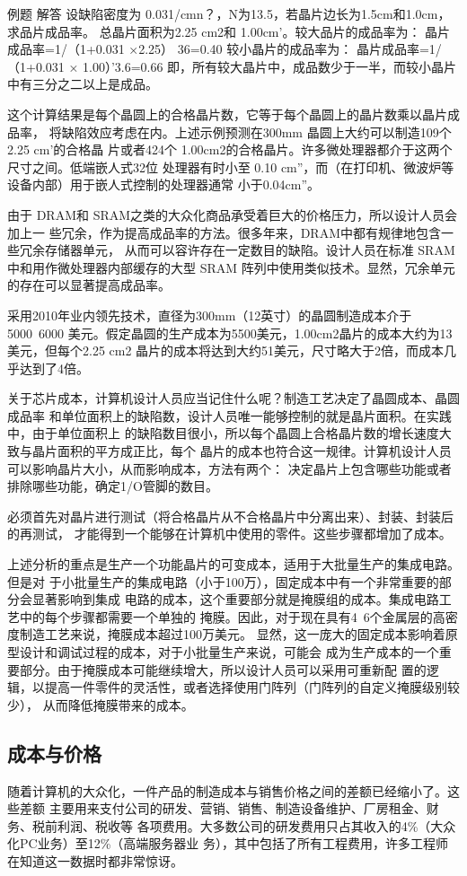 例题
解答
设缺陷密度为 0.031/cmn？，N为13.5，若晶片边长为1.5cm和1.0cm，求品片成品率。
总晶片面积为2.25 cm2和 1.00cm’。较大品片的成品率为：
晶片成品率=1/（1+0.031 ×2.25） 36=0.40
较小晶片的成品率为：
晶片成品率=1/（1+0.031 × 1.00）'3.6=0.66
即，所有较大晶片中，成品数少于一半，而较小晶片中有三分之二以上是成品。

这个计算结果是每个晶圆上的合格晶片数，它等于每个晶圆上的晶片数乘以晶片成品率，
将缺陷效应考虑在内。上述示例预测在300mm 晶圆上大约可以制造109个 2.25 cm’的合格晶
片或者424个 1.00cm2的合格晶片。许多微处理器都介于这两个尺寸之间。低端嵌人式32位
处理器有时小至 0.10 cm”，而（在打印机、微波炉等设备内部）用于嵌人式控制的处理器通常
小于0.04cm”。

由于 DRAM和 SRAM之类的大众化商品承受着巨大的价格压力，所以设计人员会加上一
些冗余，作为提高成品率的方法。很多年来，DRAM中都有规律地包含一些冗余存储器单元，
从而可以容许存在一定数目的缺陷。设计人员在标准 SRAM 中和用作微处理器内部缓存的大型
SRAM 阵列中使用类似技术。显然，冗余单元的存在可以显著提高成品率。

采用2010年业内领先技术，直径为300mm（12英寸）的晶圆制造成本介于 5000~6000
美元。假定晶圆的生产成本为5500美元，1.00cm2晶片的成本大约为13美元，但每个2.25 cm2
晶片的成本将达到大约51美元，尺寸略大于2倍，而成本几乎达到了4倍。

关于芯片成本，计算机设计人员应当记住什么呢？制造工艺决定了晶圆成本、晶圆成品率
和单位面积上的缺陷数，设计人员唯一能够控制的就是晶片面积。在实践中，由于单位面积上
的缺陷数目很小，所以每个晶圆上合格晶片数的增长速度大致与晶片面积的平方成正比，每个
晶片的成本也符合这一规律。计算机设计人员可以影响晶片大小，从而影响成本，方法有两个：
决定晶片上包含哪些功能或者排除哪些功能，确定1/O管脚的数目。

必须首先对晶片进行测试（将合格晶片从不合格晶片中分离出来）、封装、封装后的再测试，
才能得到一个能够在计算机中使用的零件。这些步骤都增加了成本。

上述分析的重点是生产一个功能晶片的可变成本，适用于大批量生产的集成电路。但是对
于小批量生产的集成电路（小于100万），固定成本中有一个非常重要的部分会显著影响到集成
电路的成本，这个重要部分就是掩膜组的成本。集成电路工艺中的每个步骤都需要一个单独的
掩膜。因此，对于现在具有4~6个金属层的高密度制造工艺来说，掩膜成本超过100万美元。
显然，这一庞大的固定成本影响着原型设计和调试过程的成本，对于小批量生产来说，可能会
成为生产成本的一个重要部分。由于掩膜成本可能继续增大，所以设计人员可以采用可重新配
置的逻辑，以提高一件零件的灵活性，或者选择使用门阵列（门阵列的自定义掩膜级别较少），
从而降低掩膜带来的成本。

\subsection{成本与价格}
随着计算机的大众化，一件产品的制造成本与销售价格之间的差额已经缩小了。这些差额
主要用来支付公司的研发、营销、销售、制造设备维护、厂房租金、财务、税前利润、税收等
各项费用。大多数公司的研发费用只占其收入的4\%（大众化PC业务）至12\%（高端服务器业
务），其中包括了所有工程费用，许多工程师在知道这一数据时都非常惊讶。

